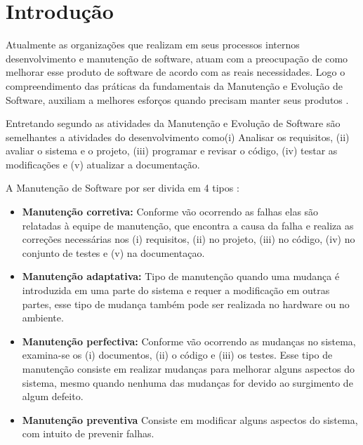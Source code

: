 \chapter{Introdução}

Atualmente as organizações que realizam em seus processos internos desenvolvimento e manutenção de software, atuam com a preocupação de como melhorar esse produto de software de acordo com as reais necessidades. Logo o compreendimento das práticas da fundamentais da Manutenção e Evolução de Software, auxiliam a melhores esforços quando precisam manter seus produtos \cite{SQLMagazine}.

Entretando  segundo \cite{pfleeger2004engenharia} as atividades da Manutenção e Evolução de Software são semelhantes a atividades do desenvolvimento como(i) Analisar os requisitos, (ii) avaliar o sistema e o projeto, (iii)  programar e revisar o código, (iv) testar as modificações e (v) atualizar a documentação.
 
A Manutenção de Software por ser divida em 4 tipos \cite{pfleeger2004engenharia}:

\begin{itemize}
	
	\item \textbf{Manutenção corretiva:} Conforme vão ocorrendo as falhas elas são relatadas à equipe de manutenção, que encontra a causa da falha e realiza as correções necessárias nos (i) requisitos, (ii) no projeto, (iii) no código, (iv) no conjunto de testes e (v) na documentaçao.
	
	\item \textbf{Manutenção adaptativa:}  Tipo de manutenção quando uma mudança é introduzida em uma parte do sistema e requer a modificação em outras partes, esse tipo de mudança também pode ser realizada no hardware ou no ambiente.
	
	\item \textbf{Manutenção perfectiva:} Conforme vão ocorrendo as mudanças no sistema, examina-se os (i) documentos, (ii) o código e (iii) os testes. Esse tipo de manutenção consiste em realizar mudanças para melhorar alguns aspectos do sistema, mesmo quando nenhuma das mudanças for devido ao surgimento de algum defeito.
	
	\item \textbf{Manutenção preventiva} Consiste em modificar alguns aspectos do sistema, com intuito de prevenir falhas. 
	
\end{itemize}

